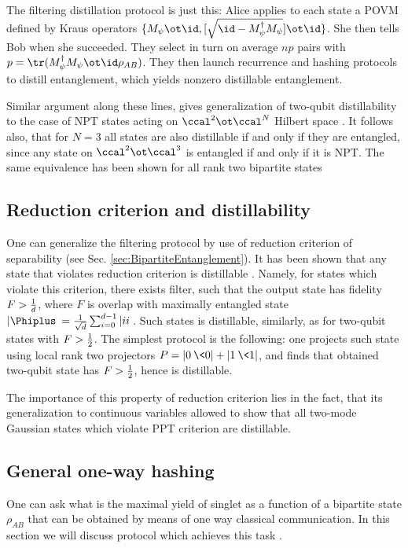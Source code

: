 \documentclass[twocolumn,aps,rmp]{revtex4}
\begin{document}
The filtering distillation protocol is just this: Alice applies to
each state a POVM defined by Kraus operators $\{M_{\psi}\ot
\id,[\sqrt{\id - M_{\psi}^{\dagger}M_{\psi}}]\ot \id\}$. She then
tells Bob when she succeeded. They select in turn on average $np$
pairs with $p={\tr}(M_{\psi}^{\dagger}M_{\psi}\ot \id
\rho_{AB})$. They then launch recurrence and hashing protocols to
distill entanglement, which yields nonzero distillable entanglement.

Similar argument along these lines, gives generalization of two-qubit
distillability to the case of NPT states acting on
$\ccal^{2}\ot\ccal^{N}$ Hilbert space \cite{DurCirac_activation,DurCLB1999-npt-bound}. It follows also, that for $N=3$
all states are also distillable if and only if they are entangled,
since any state on $\ccal^{2}\ot\ccal^3$ is entangled if and only if
it is NPT. The same equivalence has been shown for all rank two bipartite states \cite{Noiseless}

\subsection{Reduction criterion and distillability}
One can generalize the filtering protocol by use of reduction
criterion of separability (see Sec.
\ref{sec:BipartiteEntanglement}). It has been shown that any state
that violates reduction criterion is distillable \cite{reduction}.
Namely, for states which violate this criterion, there exists
filter, such that the output state has fidelity $F>{1\over d}$, where $F$
is overlap with maximally entangled state
$|\Phiplus\>={1\over \sqrt{d}}\sum_{i=0}^{d-1}|ii\>$. Such states is
distillable,  similarly, as for two-qubit states with $F>{1\over 2}$. The
simplest protocol  \cite{BraunsteinCJLS1998-nmr} is the following:
one projects such state using local rank two projectors
$P=|0\>\<0|+|1\>\<1|$, and finds that obtained two-qubit state has
$F>{1\over 2}$, hence is distillable.

The importance of this property of reduction criterion lies in the
fact, that its generalization to continuous variables allowed to
show that all two-mode Gaussian states which violate PPT criterion
are distillable.

\subsection{General one-way hashing}
\label{subsec:genhash}

One can ask what is the maximal yield of singlet as a function of a
bipartite state $\rho_{AB}$ that can be obtained by means of one way
classical communication.  In this section we will discuss protocol
which achieves this task \cite{DevetakWinter-hash,SW-nature,sw-long}.
\end{document}
